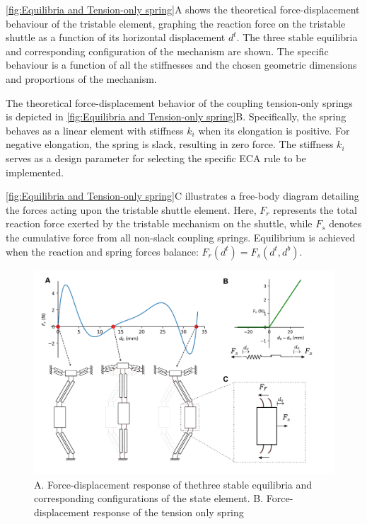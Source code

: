 \autoref*{fig:Equilibria and Tension-only spring}A shows the theoretical force-displacement behaviour of the tristable element, graphing the reaction force on the tristable shuttle as a function of its horizontal displacement \(d^t\). The three stable equilibria and corresponding configuration of the mechanism are shown. 
The specific behaviour is a function of all the stiffnesses and the chosen geometric dimensions and proportions of the mechanism. 

The theoretical force-displacement behavior of the coupling tension-only springs is depicted in \autoref*{fig:Equilibria and Tension-only spring}B. Specifically, the spring behaves as a linear element with stiffness \( k_i \) when its elongation is positive. For negative elongation, the spring is slack, resulting in zero force. The stiffness \( k_i \) serves as a design parameter for selecting the specific ECA rule to be implemented.

\autoref*{fig:Equilibria and Tension-only spring}C illustrates a free-body diagram detailing the forces acting upon the tristable shuttle element. Here, \( F_r \) represents the total reaction force exerted by the tristable mechanism on the shuttle, while \( F_s \) denotes the cumulative force from all non-slack coupling springs. Equilibrium is achieved when the reaction and spring forces balance: \( F_r(d^t) = F_s(d^t, d^b) \). 

\begin{figure}[h]
    \centering
    \includegraphics[width=\textwidth]{images/SVGs/Equilibria1.pdf}
    \caption{A. Force-displacement response of thethree stable equilibria and corresponding configurations of the state element. B. Force-displacement response of the tension only spring }
    \label{fig:Equilibria and Tension-only spring}

\end{figure}



